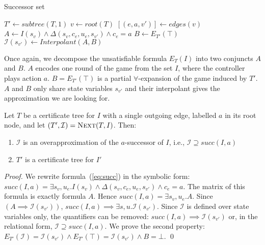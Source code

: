 \begin{algorithm}[t]
   \caption{Successor set}\label{alg:next}
   \begin{algorithmic}[1]
            \State $T' \gets subtree(T, 1)$
            \State $v \gets root(T)$
            \State $[(e,a,v')] \gets edges(v)$
            \State $A \gets I(s_v) \land  \Delta(s_v, c_e, u_e, s_{v'}) \land c_e = a$\label{alg:strat:partition:Ai}
            \State $B \gets E_{T'}(\top)$\label{alg:strat:partition:Bi}
            \State $\mathcal{I}(s_{v'}) \gets Interpolant(A, B)$\label{alg:strat:partition:I}
            \State {} \label{alg:strat:partition:return}
        \EndFunction
    \end{algorithmic}
\end{algorithm}

Once again, we decompose the unsatisfiable formula $E_T(I)$ into
two conjuncts $A$ and $B$.  $A$ encodes one round of the game
from the set $I$, where the controller plays action $a$.
$B = E_{T'}(\top)$ is a partial $\forall$-expansion of the game induced by $T'$.
$A$ and $B$ only share state variables $s_{v'}$ and their interpolant
gives the approximation we are looking for.

\begin{proposition}\label{prop:next}
    Let $T$ be a certificate tree for $I$ with a single outgoing
    edge, labelled $a$ in its root node, and let $(T',\mathcal{I})
    = \textsc{Next}(T,I)$.
    Then:
    \begin{enumerate}
        \item $\mathcal{I}$ is an overapproximation of the
            $a$-successor of $I$, i.e., $\mathcal{I} \supseteq
            succ(I, a)$
        \item $T'$ is a certificate tree for $I'$
    \end{enumerate}
\end{proposition}
\begin{proof}
We rewrite formula~(\ref{eq:succ}) in the symbolic form:
$succ(I, a) = \exists s_v,u_e. I(s_v) \land
\Delta(s_v,c_e,u_e,s_{v'}) \land c_e = a$.  The matrix of
this formula is exactly formula $A$.  Hence $succ(I,a) =
\exists s_v,u_e. A$.  Since $(A\implies
\mathcal{I}(s_{v'}))$, $succ(I,a) \implies \exists s,u.
\mathcal{I}(s_{v'})$.  Since $\mathcal{I}$ is defined over
state variables only, the quantifiers can be removed:
$succ(I,a) \implies \mathcal{I}(s_{v'})$ or, in the
relational form, $\mathcal{I} \supseteq succ(I, a)$.
We prove the second property:
$E_{T'}(\mathcal{I}) = \mathcal{I}(s_{v'}) \land
E_{T'}(\top) = \mathcal{I}(s_{v'}) \land B = \bot$.
    \qed
\end{proof}

